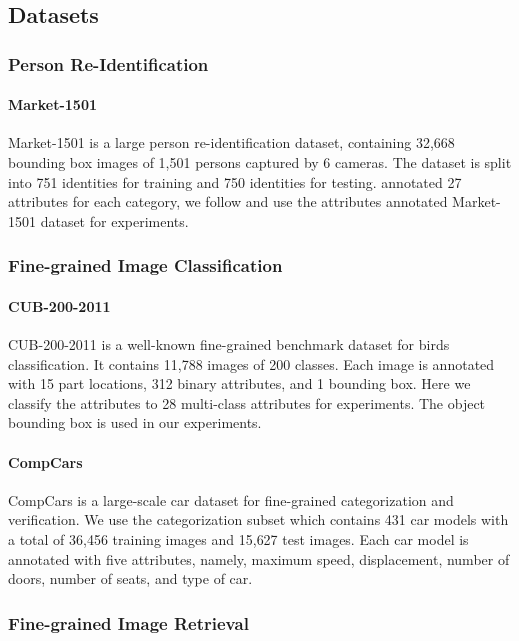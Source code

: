 \documentclass[sigconf]{acmart}
\begin{document}
\subsection{Datasets}
\subsubsection{Person Re-Identification}
\paragraph{Market-1501}
Market-1501 \cite{Zheng2015Scalable} is a large person re-identification dataset, containing 32,668 bounding box images of 1,501 persons captured by 6 cameras. The dataset is split into 751 identities for training and 750 identities for testing. \cite{lin2017improving} annotated 27 attributes for each category, we follow \cite{lin2017improving} and use the attributes annotated Market-1501 dataset for experiments.

\subsubsection{Fine-grained Image Classification}
\paragraph{CUB-200-2011}
CUB-200-2011 \cite{wah2011caltech} is a well-known fine-grained benchmark dataset for birds classification. It contains 11,788 images of 200 classes. Each image is annotated with 15 part locations, 312 binary attributes, and 1 bounding box. Here we classify the attributes to 28 multi-class attributes for experiments. The object bounding box is used in our experiments.

\paragraph{CompCars}
CompCars \cite{yang2015large} is a large-scale car dataset for fine-grained categorization and verification. We use the categorization subset which contains 431 car models with a total of 36,456 training images and 15,627 test images. 
Each car model is annotated with five attributes, namely, maximum speed, displacement, number of doors, number of seats, and type of car.

\subsubsection{Fine-grained Image Retrieval}
\end{document}
